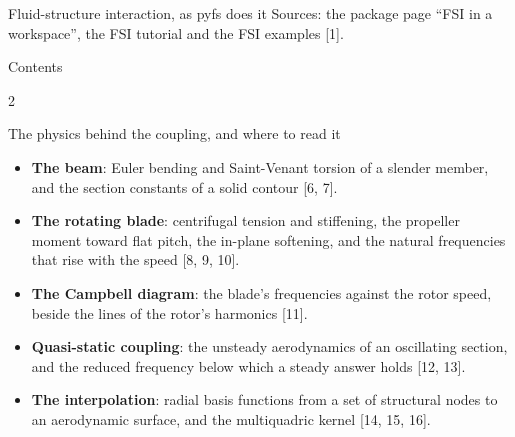 \documentclass[aspectratio=169,11pt]{beamer}
\begin{document}
  {Fluid-structure interaction, as pyfs does it}
  {Sources: the package page ``FSI in a workspace'', the FSI tutorial and the FSI examples [1].}



\begin{frame}{Contents}
\small
\begin{multicols}{2}
\tableofcontents
\end{multicols}
\end{frame}









\begin{frame}{The physics behind the coupling, and where to read it}
\begin{itemize}\small
  \item \textbf{The beam}: Euler bending and Saint-Venant torsion of a
        slender member, and the section constants of a solid contour [6, 7].
  \item \textbf{The rotating blade}: centrifugal tension and stiffening, the
        propeller moment toward flat pitch, the in-plane softening, and the
        natural frequencies that rise with the speed [8, 9, 10].
  \item \textbf{The Campbell diagram}: the blade's frequencies against the
        rotor speed, beside the lines of the rotor's harmonics [11].
  \item \textbf{Quasi-static coupling}: the unsteady aerodynamics of an
        oscillating section, and the reduced frequency below which a steady
        answer holds [12, 13].
  \item \textbf{The interpolation}: radial basis functions from a set of
        structural nodes to an aerodynamic surface, and the multiquadric
        kernel [14, 15, 16].
\end{itemize}
\end{frame}
\end{document}
